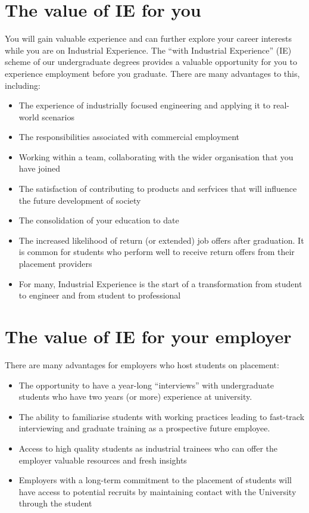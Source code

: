 \documentclass[
]{book}
\providecommand{\tightlist}{%
  \setlength{\itemsep}{0pt}\setlength{\parskip}{0pt}}
\begin{document}
\section{The value of IE for you}\label{value}

You will gain valuable experience and can further explore your career interests while you are on Industrial Experience. \citep{ucas} The ``with Industrial Experience'' (IE) scheme of our undergraduate degrees provides a valuable opportunity for you to experience employment before you graduate. There are many advantages to this, including:

\begin{itemize}
\tightlist
\item
  The experience of industrially focused engineering and applying it to real-world scenarios
\item
  The responsibilities associated with commercial employment
\item
  Working within a team, collaborating with the wider organisation that you have joined
\item
  The satisfaction of contributing to products and serfvices that will influence the future development of society
\item
  The consolidation of your education to date
\item
  The increased likelihood of return (or extended) job offers after graduation. It is common for students who perform well to receive return offers from their placement providers
\item
  For many, Industrial Experience is the start of a transformation from student to engineer and from student to professional
\end{itemize}

\section{The value of IE for your employer}\label{evalue}

There are many advantages for employers who host students on placement:

\begin{itemize}
\tightlist
\item
  The opportunity to have a year-long ``interviews'' with undergraduate students who have two years (or more) experience at university.
\item
  The ability to familiarise students with working practices leading to fast-track interviewing and graduate training as a prospective future employee.
\item
  Access to high quality students as industrial trainees who can offer the employer valuable resources and fresh insights
\item
  Employers with a long-term commitment to the placement of students will have access to potential recruits by maintaining contact with the University through the student
\end{itemize}
\end{document}
